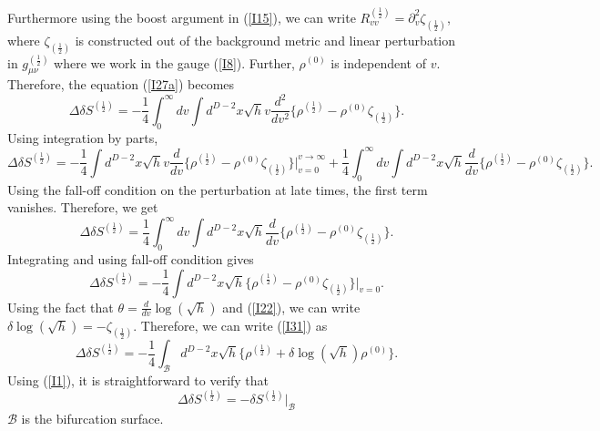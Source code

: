 \documentclass[12pt]{article}
\begin{document}
Furthermore using the boost argument in (\ref{I15}), we can write $R_{vv}^{(\frac{1}{2})}= \partial_v^2 \zeta_{(\frac{1}{2})}$, where $\zeta_{(\frac{1}{2})}$ is constructed out of the background metric and linear perturbation in $g_{\mu \nu}^{(\frac{1}{2})}$ where we work in the gauge (\ref{I8}). Further, $\rho^{(0)}$ is independent of $v$. Therefore, the equation (\ref{I27a}) becomes
\begin{equation}\label{I28}
\Delta \delta S^{(\frac{1}{2})}= -\frac{1}{4}\int_{0}^{\infty} dv \int  d^{D-2}x \sqrt{h} v \frac{d^2}{dv^2}\Big\{ \rho^{(\frac{1}{2})}- \rho^{(0)} \zeta_{(\frac{1}{2})}\Big\}.
\end{equation}
Using integration by parts,
\begin{equation}\label{I29}
\Delta \delta S^{(\frac{1}{2})}= -\frac{1}{4}\int d^{D-2}x \sqrt{h} v \frac{d}{dv}\Big\{ \rho^{(\frac{1}{2})}- \rho^{(0)} \zeta_{(\frac{1}{2})}\Big\} \Big|_{v=0}^{v \rightarrow \infty}
+\frac{1}{4}\int_{0}^{\infty} dv \int  d^{D-2}x \sqrt{h}  \frac{d}{dv}\Big\{ \rho^{(\frac{1}{2})}- \rho^{(0)} \zeta_{(\frac{1}{2})}\Big\}.
\end{equation}
Using the fall-off condition on the perturbation at late times, the first term vanishes. Therefore, we get
\begin{equation}\label{I30}
\Delta \delta S^{(\frac{1}{2})}=\frac{1}{4}\int_{0}^{\infty} dv \int  d^{D-2}x \sqrt{h}  \frac{d}{dv}\Big\{ \rho^{(\frac{1}{2})}- \rho^{(0)} \zeta_{(\frac{1}{2})}\Big\}.
\end{equation}
Integrating and using fall-off condition gives
\begin{equation}\label{I31}
\Delta \delta S^{(\frac{1}{2})}=-\frac{1}{4} \int  d^{D-2}x \sqrt{h} \Big\{ \rho^{(\frac{1}{2})}- \rho^{(0)} \zeta_{(\frac{1}{2})}\Big\}\Big|_{v=0}.
\end{equation}
Using the fact that $\theta=\frac{d }{dv} \log{(\sqrt{h})}$ and (\ref{I22}), we can write $\delta \log {(\sqrt{h})}=-\zeta_{(\frac{1}{2})}$. Therefore, we can write (\ref{I31}) as
\begin{equation}\label{I32}
\Delta \delta S^{(\frac{1}{2})}=-\frac{1}{4} \int_{\mathcal{B}}  d^{D-2}x \sqrt{h} \Big\{ \rho^{(\frac{1}{2})}+ \delta \log {(\sqrt{h})} \rho^{(0)}\Big\}.
\end{equation}
Using (\ref{I1}), it is straightforward to verify that
\begin{equation}\label{I33}
\Delta \delta S^{(\frac{1}{2})}=-\delta S^{(\frac{1}{2})}\Big|_{\mathcal{B}}
\end{equation}
$\mathcal{B}$ is the bifurcation surface.
\end{document}
